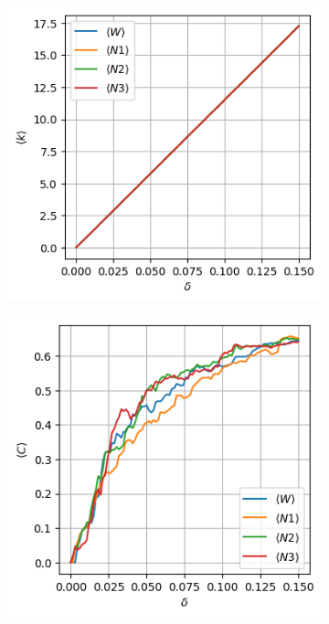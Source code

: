 \documentclass{article}
\begin{document}
\begin{figure}[ht]
  \centering
  \begin{subfigure}[b]{0.32\linewidth}
    \includegraphics[width= \textwidth]{gradoPromedio.png}
    \caption{}
	\label{fg:gradoPromedio}
  \end{subfigure}
  \begin{subfigure}[b]{0.32\linewidth}
    \includegraphics[width= \textwidth]{coeficienteClusteringPromedio.png}

\end{subfigure}
\end{figure}
\end{document}
